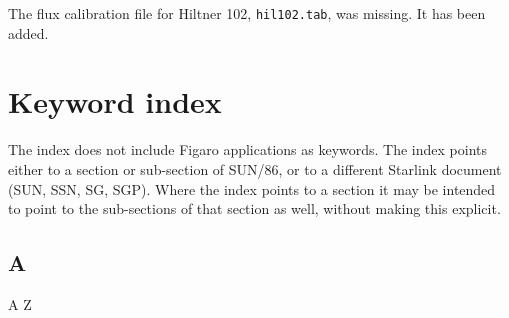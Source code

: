  The flux calibration file for Hiltner 102, {\tt hil102.tab}, was missing.
 It has been added.



\sloppy\twocolumn
\section{\label{keywords}Keyword index}

   The index does not include Figaro applications as keywords.
   The index points either to a section or sub-section of SUN/86, or to
   a different Starlink document (SUN, SSN, SG, SGP). Where the index
   points to a section it may be intended to point to the sub-sections
   of that section as well, without making this explicit.

\small

\subsection*{\label{index_A}A}

\begin{htmlonly}
A
Z
\end{htmlonly}

